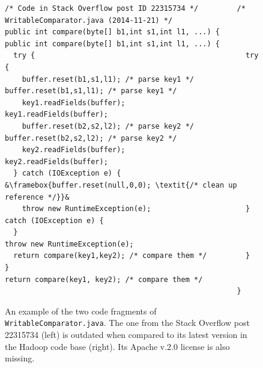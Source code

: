 \documentclass[10pt,journal,compsoc]{IEEEtran}
\begin{document}
\begin{figure}
	\begin{lstlisting}[escapechar=&]
/* Code in Stack Overflow post ID 22315734 */         /* WritableComparator.java (2014-11-21) */
public int compare(byte[] b1,int s1,int l1, ...) {    public int compare(byte[] b1,int s1,int l1, ...) {
  try {                                                 try {
    buffer.reset(b1,s1,l1); /* parse key1 */              buffer.reset(b1,s1,l1); /* parse key1 */
    key1.readFields(buffer);                              key1.readFields(buffer);
    buffer.reset(b2,s2,l2); /* parse key2 */              buffer.reset(b2,s2,l2); /* parse key2 */
    key2.readFields(buffer);                              key2.readFields(buffer);
  } catch (IOException e) {                               &\framebox{buffer.reset(null,0,0); \textit{/* clean up reference */}}&
    throw new RuntimeException(e);                      } catch (IOException e) {
  }                                                       throw new RuntimeException(e);
  return compare(key1,key2); /* compare them */         }
}                                                       return compare(key1, key2); /* compare them */
                                                      }
	\end{lstlisting}\vspace{-2ex}
	\caption{An example of the two code fragments of
		{\small\texttt{WritableComparator.java}}. The one from the
		Stack Overflow post 22315734 (left) is outdated when compared to
		its latest version in the \textsf{Hadoop} code base
		(right). Its Apache v.2.0 license is also missing.}
	\label{fig:before-after}
\end{figure}
\end{document}
